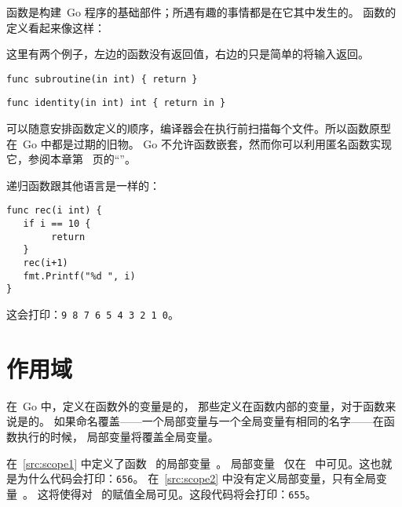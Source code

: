 
\noindent{}函数是构建~Go 程序的基础部件；所遇有趣的事情都是在它其中发生的。
函数的定义看起来像这样：

\showremarks
这里有两个例子，左边的函数没有返回值，右边的只是简单的将输入返回。

\begin{lstlisting}
func subroutine(in int) { return }
\end{lstlisting}

\begin{lstlisting}
func identity(in int) int { return in }
\end{lstlisting}

可以随意安排函数定义的顺序，编译器会在执行前扫描每个文件。所以函数原型在~Go 中都是过期的旧物。
Go 不允许函数嵌套，然而你可以利用匿名函数实现它，参阅本章第~\pageref{sec:functions as values}
页的``''。

递归函数跟其他语言是一样的：
\begin{lstlisting}[caption=递归函数]
func rec(i int) {
   if i == 10 {
        return
   }
   rec(i+1)
   fmt.Printf("%d ", i)
}
\end{lstlisting}
这会打印：\texttt{9 8 7 6 5 4 3 2 1 0}。

\section{作用域}
在~Go 中，定义在函数外的变量是的，
那些定义在函数内部的变量，对于函数来说是的。
如果命名覆盖——一个局部变量与一个全局变量有相同的名字——在函数执行的时候，
局部变量将覆盖全局变量。

\begin{minipage}{.5\textwidth}

\hfill
\vfill
\end{minipage}
\hfill
\begin{minipage}{.5\textwidth}

\hfill
\vfill
\end{minipage}

在~\ref{src:scope1} 中定义了函数~ 的局部变量~。
局部变量~ 仅在~ 中可见。这也就是为什么代码会打印：\texttt{656}。
在~\ref{src:scope2} 中没有定义局部变量，只有全局变量~。
这将使得对~ 的赋值全局可见。这段代码将会打印：\texttt{655}。

